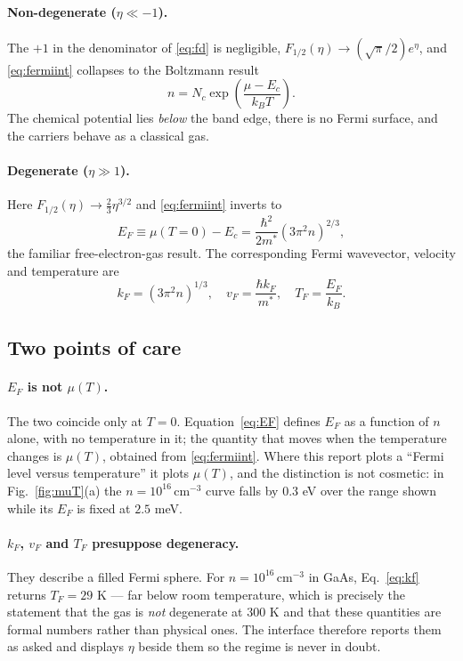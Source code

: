 \documentclass[aps,prb,reprint,nofootinbib]{revtex4-2}
\begin{document}
\paragraph{Non-degenerate ($\eta \ll -1$).} The $+1$ in the denominator of \eqref{eq:fd} is
negligible, $F_{1/2}(\eta)\to(\sqrt\pi/2)e^\eta$, and \eqref{eq:fermiint} collapses to the
Boltzmann result
\begin{equation}
  n = N_c\exp\!\left(\frac{\mu-E_c}{k_BT}\right).
  \label{eq:boltz}
\end{equation}
The chemical potential lies \emph{below} the band edge, there is no Fermi surface, and the
carriers behave as a classical gas.

\paragraph{Degenerate ($\eta \gg 1$).} Here $F_{1/2}(\eta)\to\tfrac23\eta^{3/2}$ and
\eqref{eq:fermiint} inverts to
\begin{equation}
  E_F \equiv \mu(T{=}0) - E_c = \frac{\hbar^2}{2m^*}\left(3\pi^2 n\right)^{2/3},
  \label{eq:EF}
\end{equation}
the familiar free-electron-gas result. The corresponding Fermi wavevector, velocity and
temperature are
\begin{equation}
  k_F = (3\pi^2n)^{1/3},\quad v_F = \frac{\hbar k_F}{m^*},\quad T_F = \frac{E_F}{k_B}.
  \label{eq:kf}
\end{equation}

\subsection{Two points of care}

\paragraph{$E_F$ is not $\mu(T)$.} The two coincide only at $T=0$. Equation~\eqref{eq:EF}
defines $E_F$ as a function of $n$ alone, with no temperature in it; the quantity that moves
when the temperature changes is $\mu(T)$, obtained from \eqref{eq:fermiint}. Where this report
plots a ``Fermi level versus temperature'' it plots $\mu(T)$, and the distinction is not
cosmetic: in Fig.~\ref{fig:muT}(a) the $n=10^{16}\,$cm$^{-3}$ curve falls by $0.3$ eV over the
range shown while its $E_F$ is fixed at $2.5$ meV.

\paragraph{$k_F$, $v_F$ and $T_F$ presuppose degeneracy.} They describe a filled Fermi sphere.
For $n=10^{16}\,$cm$^{-3}$ in GaAs, Eq.~\eqref{eq:kf} returns $T_F = 29$ K --- far below room
temperature, which is precisely the statement that the gas is \emph{not} degenerate at $300$ K
and that these quantities are formal numbers rather than physical ones. The interface therefore
reports them as asked and displays $\eta$ beside them so the regime is never in doubt.
\end{document}
